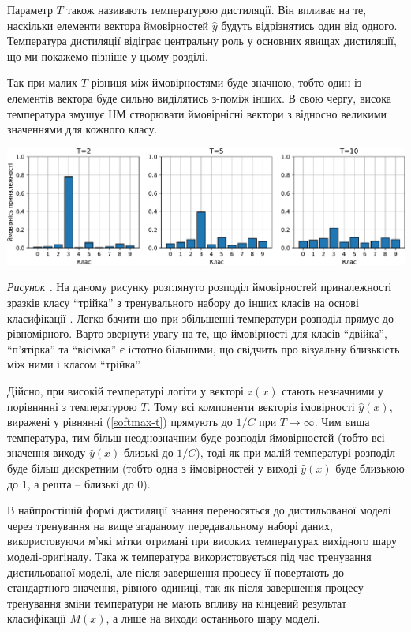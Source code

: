 \documentclass[14pt,a4paper]{extarticle}
\newcounter{e}
\newcounter{pic}
\newcommand{\pic}[1]{\refstepcounter{pic} \vspace{-0.3cm}\textit{Рисунок \arabic{pic}\label{#1}.}}
\numberwithin{equation}{section}
\numberwithin{figure}{section}
\begin{document}
 Параметр $T$ також називають температурою дистиляції. Він впливає на те, наскільки елементи вектора ймовірностей $\hat{y}$ будуть відрізнятись один від одного. Температура дистиляції відіграє центральну роль у основних явищах дистиляції, що ми покажемо пізніше у цьому розділі.

 Так при малих $T$ різниця між ймовірностями буде значною, тобто один із елементів вектора буде сильно виділятись з-поміж інших. В свою чергу, висока температура змушує НМ створювати ймовірнісні вектори з відносно великими значеннями для кожного класу.
 
 \begin{center}
 	\includegraphics[width=17cm]{../images/TvsP.pdf}
 \end{center}
 \begin{center}
 	\pic{distilation} На даному рисунку розглянуто розподіл ймовірностей приналежності зразків класу ``трійка'' з тренувального набору до інших класів на основі класифікації . Легко бачити що при збільшенні температури розподіл прямує до рівномірного. Варто звернути увагу на те, що ймовірності для класів ``двійка'', ``п'ятірка'' та ``вісімка'' є істотно більшими, що свідчить про візуальну близькість між ними і класом ``трійка''.
 \end{center}
 
 Дійсно, при високій температурі логіти у векторі $z(x)$ стають незначними у порівнянні з температурою $T$. Тому всі компоненти векторів імовірності $\hat{y}(x)$, виражені у рівнянні (\ref{softmax-t}) прямують до $1/C$ при $T \to \infty$. Чим вища температура, тим більш неоднозначним буде розподіл ймовірностей (тобто всі значення виходу $\hat{y}(x)$ близькі до $1/C$), тоді як
 при малій температурі розподіл буде більш дискретним (тобто одна з ймовірностей у виході $\hat{y}(x)$ буде близькою до 1, а решта -- близькі до 0).
 
 В найпростішій формі дистиляції знання переносяться до дистильованої моделі через тренування на вище згаданому передавальному наборі даних, використовуючи м'які мітки отримані при високих температурах вихідного шару моделі-оригіналу. Така ж температура використовується під час тренування дистильованої моделі, але після завершення процесу її повертають до стандартного значення, рівного одиниці, так як після завершення процесу тренування зміни температури не мають впливу на кінцевий результат класифікації $M(x)$, а лише на виходи останнього шару моделі.
 
\end{document}
